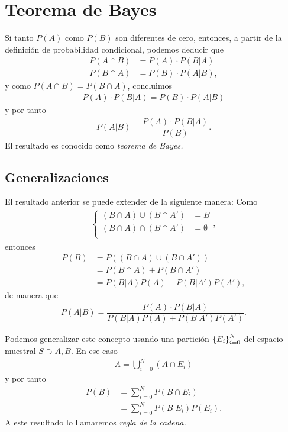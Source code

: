 \section{Teorema de Bayes}

Si tanto $ P(A) $ como $ P(B) $ son diferentes de cero, entonces, a partir de la definición de probabilidad condicional, podemos deducir que 
\begin{align}
	P(A \cap B) &=P(A)\cdot P(B|A)\\
	P(B \cap A) &=P(B)\cdot P(A|B),
\end{align}
y como $ P(A\cap B)= P(B\cap A) $, concluimos 
\begin{align}
	P(A)\cdot P(B|A) = P(B)\cdot P(A|B)
\end{align}
y por tanto 
\begin{align}
	P(A|B)=\dfrac{P(A)\cdot P(B|A)}{P(B)}.
\end{align}
El resultado es conocido como \emph{teorema de Bayes.}

\subsection{Generalizaciones}

El resultado anterior se puede extender de la siguiente manera: Como 
\begin{align}
	\begin{cases}
		(B\cap A) \cup (B \cap A') &= B\\
		(B\cap A) \cap (B \cap A') &= \emptyset\\
	\end{cases},
\end{align}
entonces
\begin{align}
	P(B) & = P\left( (B\cap A) \cup (B \cap A') \right)\\
	&= P(B\cap A) + P(B\cap A')\\
	&= P(B|A)P(A) + P(B|A')P(A'),
\end{align}
de manera que 
\begin{align}
	P(A|B)=\dfrac{P(A)\cdot P(B|A)}{P(B|A)P(A) + P(B|A')P(A')}.
\end{align}

Podemos generalizar este concepto usando una partición $ \left\{ E_i \right\}_{i=0}^{N} $ del espacio muestral $ S \supset A, B$. En ese caso
\begin{align}
	A = \bigcup_{i=0}^{N}(A\cap E_i)
\end{align}
y por tanto
\begin{align}
	P(B) &= \sum_{i=0}^{N} P(B\cap E_i)\\
	&= \sum_{i=0}^{N} P(B|E_i)P(E_i).
\end{align}
A este resultado lo llamaremos \emph{regla de la cadena.}


